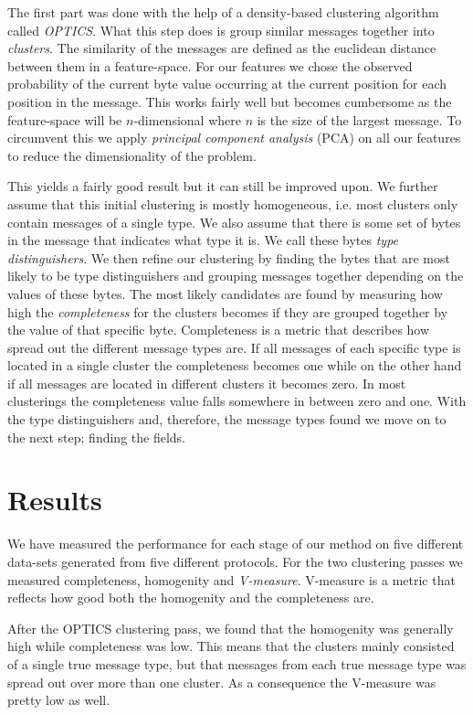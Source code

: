 \documentclass[a4paper,twocolumn]{article}
\begin{document}
The first part was done with the help of a density-based clustering algorithm
called \emph{OPTICS}. What this step does is group similar messages together into
\emph{clusters}. The similarity of the messages are defined as the euclidean
distance between them in a feature-space. For our features we chose the
observed probability of the current byte value occurring at the current
position for each position in the message. This works fairly well but becomes
cumbersome as the feature-space will be $n$-dimensional where $n$ is the size
of the largest message. To circumvent this we apply
\emph{principal component analysis} (PCA) on all our features to reduce the
dimensionality of the problem.

This yields a fairly good result but it can still be improved upon. We further
assume that this initial clustering is mostly homogeneous, i.e. most clusters
only contain messages of a single type. We also assume that there is some set
of bytes in the message that indicates what type it is. We call these bytes
\emph{type distinguishers}. We then refine our clustering by finding the bytes
that are most likely to be type distinguishers and grouping messages together
depending on the values of these bytes. The most likely candidates are found by
measuring how high the \emph{completeness} for the clusters becomes if they are
grouped together by the value of that specific byte. Completeness is a metric
that describes how spread out the different message types are. If all messages
of each specific type is located in a single cluster the completeness becomes
one while on the other hand if all messages are located in different clusters
it becomes zero. In most clusterings the completeness value falls somewhere
in between zero and one. With the type distinguishers and, therefore, the
message types found we move on to the next step; finding the fields.

\section{Results}
We have measured the performance for each stage of our method on five
different data-sets generated from five different protocols. For the two
clustering passes we measured completeness, homogenity and \emph{V-measure}.
V-measure is a metric that reflects how good both the homogenity and the
completeness are. 

After the OPTICS clustering pass, we found that the homogenity was generally
high while completeness was low. This means that the clusters mainly
consisted of a single true message type, but that messages from each true
message type was spread out over more than one cluster. As a consequence the
V-measure was pretty low as well.
\end{document}
